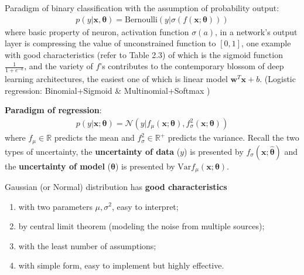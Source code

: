 Paradigm of binary classification with the assumption of probability output:
\begin{gather}
    p(y|\bm{x},\bm{\theta})
    =\text{Bernoulli}(y|\sigma(f(\bm{x};\bm{\theta})))
\end{gather}
where basic property of neuron, activation function $\sigma(a)$, in a network's output layer is compressing the value of unconstrained function to $[0,1]$, 
one example with good characteristics (refer to \citep{pml1Book} Table 2.3) 
of which is the sigmoid function $\frac{1}{1+e^{-a}}$, 
and the variety of $f$'s contributes to the contemporary blossom of deep learning architectures, 
the easiest one of which is linear model $\bm{w}^T\bm{x}+b$. (Logistic regression: Binomial+Sigmoid \& Multinomial+Softmax
)

\textbf{Paradigm of regression}:
\begin{gather}
    p(y|\bm{x};\bm{\theta})
    =\mathcal{N}(y|
    f_\mu(\bm{x};\bm{\theta}),
    f_\sigma^2(\bm{x};\bm{\theta})
    )
\end{gather}
where $f_\mu\in\mathbb{R}$ predicts the mean 
and $f_\sigma^2\in\mathbb{R}^+$ predicts the variance.
Recall the two types of uncertainty,
the \textbf{uncertainty of data} ($y$) is presented by $f_\sigma(\bm{x};\bm{\hat{\theta}})$ and 
the \textbf{uncertainty of model} ($\bm{\theta}$) is presented by 
$\mathrm{Var}f_\mu(\bm{x};\bm{\theta})$.

Gaussian (or Normal) distribution has \textbf{good characteristics}
\begin{enumerate}
    \item with two parameters $\mu,\sigma^2$, easy to interpret;
    \item by central limit theorem (modeling the noise from multiple sources);
    \item with the least number of assumptions;
    \item with simple form, easy to implement but highly effective.
\end{enumerate}







